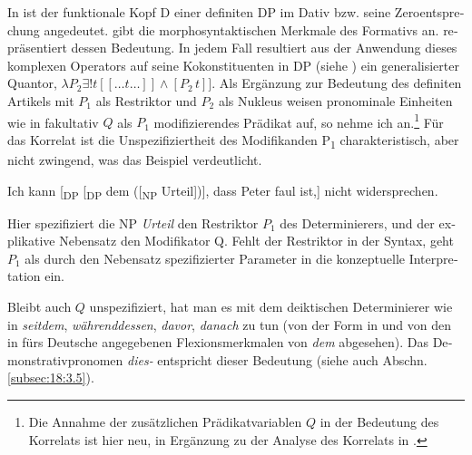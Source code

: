 \documentclass[output=paper, colorlinks, citecolor=brown, booklanguage=german]{langscibook}
\begin{document}
\begin{otherlanguage}{german}
\ea \label{ex:18:23}
	\z
\z

\noindent In  ist der funktionale Kopf D einer definiten DP im Dativ bzw. seine Zeroentsprechung angedeutet.  gibt die morphosyntaktischen Merkmale des Formativs an.  repräsentiert dessen Bedeutung. In jedem Fall resultiert aus der Anwendung dieses komplexen Operators auf seine Kokonstituenten in DP (siehe ) ein generalisierter Quantor, $\lambda P_2 \exists !t [[\dots t \dots]] \wedge [P_2\, t]]$. Als Ergänzung zur Bedeutung des definiten Artikels mit $P_1$ als Restriktor und $P_2$ als Nukleus weisen pronominale Einheiten wie in  fakultativ $Q$ als $P_1$ modifizierendes Prädikat auf, so nehme ich an.\footnote{\label{fn:18:7}Die Annahme der zusätzlichen Prädikatvariablen $Q$ in der Bedeutung des Korrelats ist hier neu, in Ergänzung zu der Analyse des Korrelats in \citet{Zimmermann2016}.} Für das Korrelat ist die Unspezifiziertheit des Modifikanden P\textsubscript{1} charakteristisch, aber nicht zwingend, was das Beispiel  verdeutlicht.

\ea \label{ex:18:24} Ich kann [\textsubscript{DP} [\textsubscript{DP} dem ([\textsubscript{NP} Urteil])], dass Peter faul ist,] nicht widersprechen.
\z

\noindent Hier spezifiziert die NP \textit{Urteil} den Restriktor $P_1$ des Determinierers, und der ex\-pli\-ka\-ti\-ve Nebensatz den Modifikator Q. Fehlt der Restriktor in der Syntax, geht $P_1$ als durch den Nebensatz spezifizierter Parameter in die konzeptuelle Interpretation ein.

Bleibt auch $Q$ unspezifiziert, hat man es mit dem deiktischen Determinierer wie in \textit{seitdem}, \textit{währenddessen}, \textit{davor}, \textit{danach} zu tun (von der Form in  und von den in  fürs Deutsche angegebenen Flexionsmerkmalen von \textit{dem} abgesehen). Das Demonstrativpronomen \textit{dies-} entspricht dieser Bedeutung (siehe auch Abschn. \ref{subsec:18:3.5}).


\end{otherlanguage}
\end{document}
